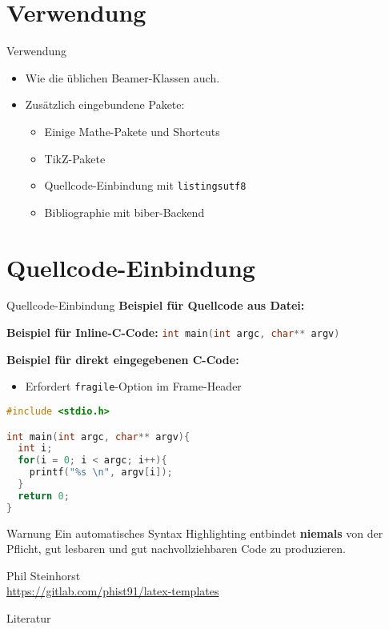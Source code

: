 \documentclass[10pt,
  wide,
  xcolor={x11names},
  hyperref={colorlinks=false},
  pantone312]{beamer}    %
\begin{document}
\section{Verwendung}
\begin{frame}[t]{Verwendung}
  \begin{itemize}[<+->]
    \item Wie die üblichen Beamer-Klassen auch.
    \item Zusätzlich eingebundene Pakete:
    \begin{itemize}
      \item Einige Mathe-Pakete und Shortcuts
      \item TikZ-Pakete
      \item Quellcode-Einbindung mit \texttt{listingsutf8}
      \minoritem {}
      \item Bibliographie mit biber-Backend \cite{biblatex-ctan}
    \end{itemize}
  \end{itemize}
\end{frame}

\section{Quellcode-Einbindung}
\begin{frame}[t]{Quellcode-Einbindung}
  \textbf{Beispiel für Quellcode aus Datei:}
  
  
  \textbf{Beispiel für Inline-C-Code:} \lstinline[language=c]|int main(int argc, char** argv)|
\end{frame}

\begin{frame}[t,fragile]{}
\textbf{Beispiel für direkt eingegebenen C-Code:}
\begin{itemize}
  \item Erfordert \texttt{fragile}-Option im Frame-Header
\end{itemize}

\begin{lstlisting}[language=c]
#include <stdio.h>

int main(int argc, char** argv){
  int i;
  for(i = 0; i < argc; i++){
    printf("%s \n", argv[i]);
  }
  return 0;
}
\end{lstlisting}
\end{frame}

\begin{frame}[c]{}
  \begin{alertblock}{Warnung}
    Ein automatisches Syntax Highlighting entbindet \textbf{niemals} von der Pflicht, gut lesbaren und gut nachvollziehbaren Code zu produzieren.
  \end{alertblock}
  
  \pause
  
  \begin{flushright}
  Phil Steinhorst \\
  \url{https://gitlab.com/phist91/latex-templates}
  \end{flushright}
\end{frame}

\begin{frame}[c]{Literatur}
  \printbibliography
\end{frame}
\end{document}
